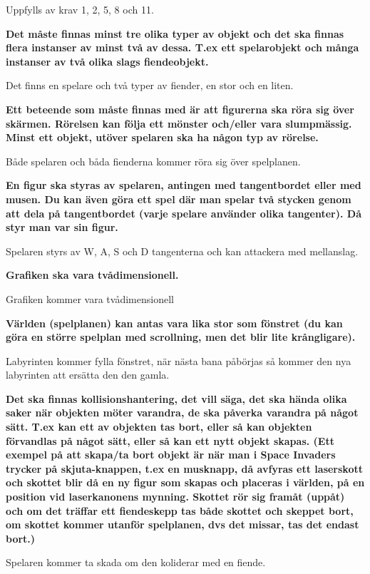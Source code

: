 \documentclass{TDP005mall}
\begin{document}
Uppfylls av krav 1, 2, 5, 8 och 11.

\textbf{Det måste finnas minst tre olika typer av objekt och det ska finnas flera instanser av minst två av dessa. T.ex ett spelarobjekt och många instanser av två olika slags fiendeobjekt.}

Det finns en spelare och två typer av fiender, en stor och en liten.

\textbf{Ett beteende som måste finnas med är att figurerna ska röra sig över skärmen. Rörelsen kan följa ett mönster och/eller vara slumpmässig. Minst ett objekt, utöver spelaren ska ha någon typ av rörelse.}

Både spelaren och båda fienderna kommer röra sig över spelplanen.

\textbf{En figur ska styras av spelaren, antingen med tangentbordet eller med musen. Du kan även göra ett spel där man spelar två stycken genom att dela på tangentbordet (varje spelare använder olika tangenter). Då styr man var sin figur.}

Spelaren styrs av W, A, S och D tangenterna och kan attackera med mellanslag.

\textbf{Grafiken ska vara tvådimensionell.}

Grafiken kommer vara tvådimensionell

\textbf{Världen (spelplanen) kan antas vara lika stor som fönstret (du kan göra en större spelplan med scrollning, men det blir lite krångligare).}

Labyrinten kommer fylla fönstret, när nästa bana påbörjas så kommer den nya labyrinten  att ersätta den den gamla.

\textbf{Det ska finnas kollisionshantering, det vill säga, det ska hända olika saker när objekten möter varandra, de ska påverka varandra på något sätt. T.ex kan ett av objekten tas bort, eller så kan objekten förvandlas på något sätt, eller så kan ett nytt objekt skapas. (Ett exempel på att skapa/ta bort objekt är när man i Space Invaders trycker på skjuta-knappen, t.ex en musknapp, då avfyras ett laserskott och skottet blir då en ny figur som skapas och placeras i världen, på en position vid laserkanonens mynning. Skottet rör sig framåt (uppåt) och om det träffar ett fiendeskepp tas både skottet och skeppet bort, om skottet kommer utanför spelplanen, dvs det missar, tas det endast bort.)}

Spelaren kommer ta skada om den koliderar med en fiende.
\end{document}
